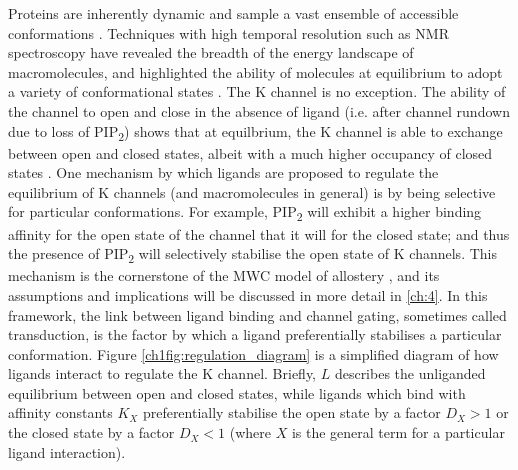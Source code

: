 Proteins are inherently dynamic and sample a vast ensemble of accessible conformations \cite{boehr_role_2009}.
Techniques with high temporal resolution such as NMR spectroscopy have revealed the breadth of the energy landscape of macromolecules, and highlighted the ability of molecules at equilibrium to adopt a variety of conformational states \cite{mittermaier_new_2006}.
The K\ATP{} channel is no exception.
The ability of the channel to open and close in the absence of ligand (i.e. after channel rundown due to loss of PIP\textsubscript{2}) shows that at equilbrium, the K\ATP{} channel is able to exchange between open and closed states, albeit with a much higher occupancy of closed states \cite{ribalet_regulation_2000, proks_running_2016-2}.
One mechanism by which ligands are proposed to regulate the equilibrium of K\ATP{} channels (and macromolecules in general) is by being selective for particular conformations.
For example, PIP\textsubscript{2} will exhibit a higher binding affinity for the open state of the channel that it will for the closed state; and thus the presence of PIP\textsubscript{2} will selectively stabilise the open state of K\ATP{} channels.
This mechanism is the cornerstone of the MWC model of allostery \cite{monod_nature_1965-1, rubin_nature_1966, garcia_chapter_2011, marzen_statistical_2013}, and its assumptions and implications will be discussed in more detail in \ref{ch:4}.
In this framework, the link between ligand binding and channel gating, sometimes called transduction, is the factor by which a ligand preferentially stabilises a particular conformation.
Figure \ref{ch1fig:regulation_diagram} is a simplified diagram of how ligands interact to regulate the K\ATP{} channel.
Briefly, $L$ describes the unliganded equilibrium between open and closed states, while ligands which bind with affinity constants $K_X$ preferentially stabilise the open state by a factor $D_X > 1$ or the closed state by a factor $D_X < 1$ (where $X$ is the general term for a particular ligand interaction).


